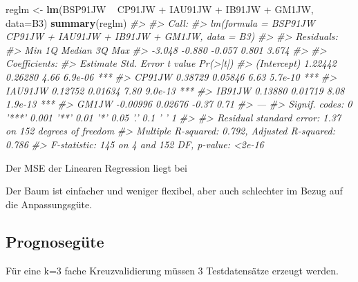 \documentclass[12pt,]{book}
\makeatletter
\newenvironment{Shaded}{\begin{snugshade}}{\end{snugshade}}
\newcommand{\KeywordTok}[1]{\textcolor[rgb]{0.13,0.29,0.53}{\textbf{{#1}}}}
\newcommand{\DataTypeTok}[1]{\textcolor[rgb]{0.13,0.29,0.53}{{#1}}}
\newcommand{\DecValTok}[1]{\textcolor[rgb]{0.00,0.00,0.81}{{#1}}}
\newcommand{\StringTok}[1]{\textcolor[rgb]{0.31,0.60,0.02}{{#1}}}
\newcommand{\CommentTok}[1]{\textcolor[rgb]{0.56,0.35,0.01}{\textit{{#1}}}}
\newcommand{\NormalTok}[1]{{#1}}
\newenvironment{kframe}{%
\medskip{}
\setlength{\fboxsep}{.8em}
 \def\at@end@of@kframe{}%
 \ifinner\ifhmode%
  \def\at@end@of@kframe{\end{minipage}}%
  \begin{minipage}{\columnwidth}%
 \fi\fi%
 \def\FrameCommand##1{\hskip\@totalleftmargin \hskip-\fboxsep
 \colorbox{shadecolor}{##1}\hskip-\fboxsep
     \hskip-\linewidth \hskip-\@totalleftmargin \hskip\columnwidth}%
 \MakeFramed {\advance\hsize-\width
   \@totalleftmargin\z@ \linewidth\hsize
   \@setminipage}}%
 {\par\unskip\endMakeFramed%
 \at@end@of@kframe}
\renewenvironment{Shaded}{\begin{kframe}}{\end{kframe}}
\makeatother
\begin{document}
\begin{Shaded}
\begin{Highlighting}[]
\NormalTok{reglm <-}\StringTok{ }\KeywordTok{lm}\NormalTok{(BSP91JW ~}\StringTok{ }\NormalTok{CP91JW +}\StringTok{ }\NormalTok{IAU91JW +}\StringTok{ }\NormalTok{IB91JW +}\StringTok{ }\NormalTok{GM1JW, }\DataTypeTok{data=}\NormalTok{B3)}
\KeywordTok{summary}\NormalTok{(reglm)}
\CommentTok{#> }
\CommentTok{#> Call:}
\CommentTok{#> lm(formula = BSP91JW ~ CP91JW + IAU91JW + IB91JW + GM1JW, data = B3)}
\CommentTok{#> }
\CommentTok{#> Residuals:}
\CommentTok{#>    Min     1Q Median     3Q    Max }
\CommentTok{#> -3.048 -0.880 -0.057  0.801  3.674 }
\CommentTok{#> }
\CommentTok{#> Coefficients:}
\CommentTok{#>             Estimate Std. Error t value Pr(>|t|)    }
\CommentTok{#> (Intercept)  1.22442    0.26280    4.66  6.9e-06 ***}
\CommentTok{#> CP91JW       0.38729    0.05846    6.63  5.7e-10 ***}
\CommentTok{#> IAU91JW      0.12752    0.01634    7.80  9.0e-13 ***}
\CommentTok{#> IB91JW       0.13880    0.01719    8.08  1.9e-13 ***}
\CommentTok{#> GM1JW       -0.00996    0.02676   -0.37     0.71    }
\CommentTok{#> ---}
\CommentTok{#> Signif. codes:  0 '***' 0.001 '**' 0.01 '*' 0.05 '.' 0.1 ' ' 1}
\CommentTok{#> }
\CommentTok{#> Residual standard error: 1.37 on 152 degrees of freedom}
\CommentTok{#> Multiple R-squared:  0.792,  Adjusted R-squared:  0.786 }
\CommentTok{#> F-statistic:  145 on 4 and 152 DF,  p-value: <2e-16}
\end{Highlighting}
\end{Shaded}

Der MSE der Linearen Regression liegt bei

\begin{Shaded}
\end{Shaded}

Der Baum ist einfacher und weniger flexibel, aber auch schlechter im
Bezug auf die Anpassungsgüte.

\subsection{Prognosegüte}\label{prognosegute}

Für eine k=3 fache Kreuzvalidierung müssen 3 Testdatensätze erzeugt
werden.
\end{document}
